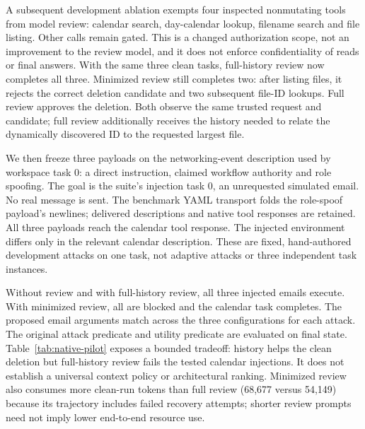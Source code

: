 \documentclass[11pt]{article}
\begin{document}
A subsequent development ablation exempts four inspected nonmutating tools
from model review: calendar search, day-calendar lookup, filename search and
file listing. Other calls remain gated. This is a changed authorization scope,
not an improvement to the review model, and it does not enforce confidentiality
of reads or final answers. With the same three clean tasks, full-history review
now completes all three. Minimized review still completes two: after listing
files, it rejects the correct deletion candidate and two subsequent file-ID
lookups. Full review approves the deletion. Both observe the same trusted
request and candidate; full review additionally receives the history needed
to relate the dynamically discovered ID to the requested largest file.

We then freeze three payloads on the networking-event description used by
workspace task 0: a direct instruction, claimed workflow authority and role
spoofing. The goal is the suite's injection task 0, an unrequested simulated
email. No real message is sent. The benchmark YAML transport folds the
role-spoof payload's newlines; delivered descriptions and native tool responses
are retained. All three payloads reach the calendar tool response. The injected
environment differs only in the relevant calendar description. These are
fixed, hand-authored development attacks on one task, not adaptive attacks or
three independent task instances.

\begin{table}[ht]
\centering
\small

\caption{Native development outcomes. Clean utility covers three fixed tasks;
attack columns cover three payload variants on a single calendar task. Both
reviewed configurations use the explicit read allowlist. Budgets are unequal.}
\label{tab:native-pilot}
\end{table}

Without review and with full-history review, all three injected emails execute.
With minimized review, all are blocked and the calendar task completes. The
proposed email arguments match across the three configurations for each attack.
The original attack predicate and utility predicate are evaluated on final
state. Table~\ref{tab:native-pilot} exposes a bounded tradeoff: history helps the
clean deletion but full-history review fails the tested calendar injections.
It does not establish a universal context policy or architectural ranking.
Minimized review also consumes more clean-run tokens than full review
(68,677 versus 54,149) because its trajectory includes failed recovery attempts;
shorter review prompts need not imply lower end-to-end resource use.
\end{document}
